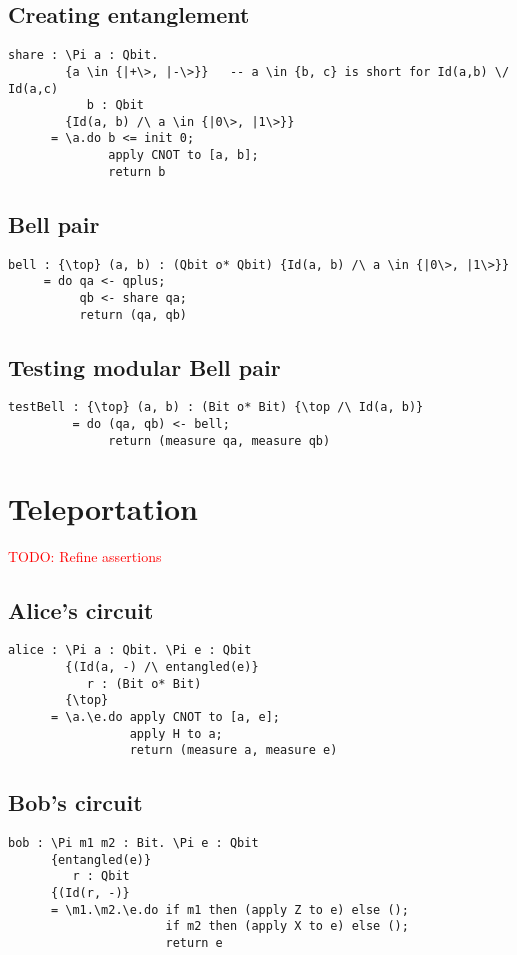 \documentclass[acmsmall,nonacm,timestamp,review=false,anonymous=false]{acmart}
\newcommand{\todo}[1]{\textcolor{red}{#1}}
\begin{document}
\subsection{Creating entanglement}
\begin{lstlisting}[language=QHaskell]
share : \Pi a : Qbit.
        {a \in {|+\>, |-\>}}   -- a \in {b, c} is short for Id(a,b) \/ Id(a,c)
           b : Qbit
        {Id(a, b) /\ a \in {|0\>, |1\>}}
      = \a.do b <= init 0;
              apply CNOT to [a, b];
              return b
\end{lstlisting}

\subsection{Bell pair}
\begin{lstlisting}[language=QHaskell]
bell : {\top} (a, b) : (Qbit o* Qbit) {Id(a, b) /\ a \in {|0\>, |1\>}}
     = do qa <- qplus;
          qb <- share qa;
          return (qa, qb)
\end{lstlisting}

\subsection{Testing modular Bell pair}
\begin{lstlisting}[language=QHaskell]
testBell : {\top} (a, b) : (Bit o* Bit) {\top /\ Id(a, b)}
         = do (qa, qb) <- bell;
              return (measure qa, measure qb)
\end{lstlisting}

\section{Teleportation}
\label{app:teleport}
\todo{TODO: Refine assertions}
\subsection{Alice's circuit}
\begin{lstlisting}[language=QHaskell]
alice : \Pi a : Qbit. \Pi e : Qbit
        {(Id(a, -) /\ entangled(e)}
           r : (Bit o* Bit)
        {\top}
      = \a.\e.do apply CNOT to [a, e];
                 apply H to a;
                 return (measure a, measure e)
\end{lstlisting}

\subsection{Bob's circuit}
\begin{lstlisting}[language=QHaskell]
bob : \Pi m1 m2 : Bit. \Pi e : Qbit
      {entangled(e)}
         r : Qbit
      {(Id(r, -)}
      = \m1.\m2.\e.do if m1 then (apply Z to e) else ();
                      if m2 then (apply X to e) else ();
                      return e
\end{lstlisting}
\end{document}
